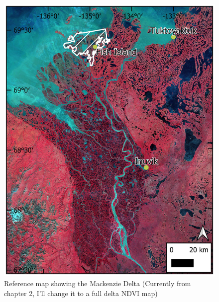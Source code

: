 \documentclass[
]{book}
\begin{document}
\begin{figure}
\centering
\includegraphics{images/16-fig1.png}
\caption{Reference map showing the Mackenzie Delta (Currently from chapter 2, I'll change it to a full delta NDVI map)}
\end{figure}
\end{document}
